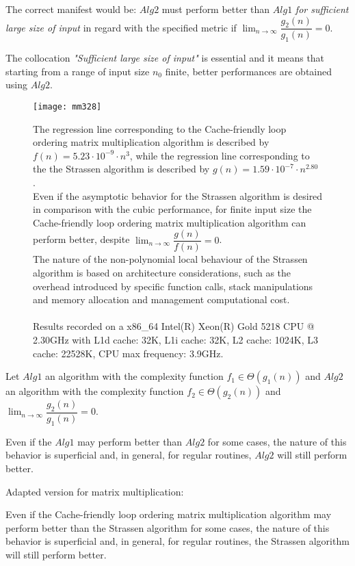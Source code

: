 The correct manifest would be: $Alg2$ must perform better than $Alg1$ \textit{for sufficient large size of input} in regard with the specified metric if $\lim_{n\to\infty} \dfrac{g_2(n)}{g_1(n)} = 0$. 

The collocation
 \textit{"Sufficient large size of input"} is essential and it means that starting from a range of input size $n_{0}$ finite, better performances are obtained using $Alg2$.


\begin{figure}[H]
\centering
\texttt{[image: mm328]}
\caption{The regression line corresponding to the Cache-friendly loop ordering matrix multiplication algorithm is described by $f(n) = 5.23 \cdot 10^{-9} \cdot n^{3} $, while the regression line corresponding to the the Strassen algorithm is described by $g(n) = 1.59 \cdot 10^{-7} \cdot n^{2.80} $ . \\  Even if the asymptotic behavior for the Strassen algorithm is desired in comparison with the cubic performance, for finite input size the Cache-friendly loop ordering matrix multiplication algorithm can perform better, despite $\lim_{n\to\infty} \dfrac{g(n)}{f(n)} = 0$.  \\ The nature of the non-polynomial local behaviour of the Strassen algorithm is based on architecture considerations, such as the overhead introduced by specific function calls, stack manipulations and memory allocation and management computational cost. \\ \\ Results recorded on a x86\_64 Intel(R) Xeon(R) Gold 5218 CPU @ 2.30GHz with L1d cache: 32K, L1i cache: 32K, L2 cache: 1024K, L3 cache: 22528K, CPU max frequency: 3.9GHz.}
\end{figure}


\begin{pitfall}
Let $Alg1$ an algorithm with the complexity function $f_{1} \in \Theta(g_1(n))$  and $Alg2$ an algorithm with the complexity function $f_{2} \in \Theta(g_2(n))$ and $\lim_{n\to\infty} \dfrac{g_2(n)}{g_1(n)} = 0$.

Even if the $Alg1$ may perform better than $Alg2$ for some cases, the nature of this behavior is superficial and, in general, for regular routines, $Alg2$ will still perform better.
\end{pitfall}

\begin{pitfall}
Adapted version for matrix multiplication: 

Even if the Cache-friendly loop ordering matrix multiplication algorithm may perform better than the Strassen algorithm for some cases, the nature of this behavior is superficial and, in general, for regular routines, the Strassen algorithm will still perform better.
\end{pitfall}

